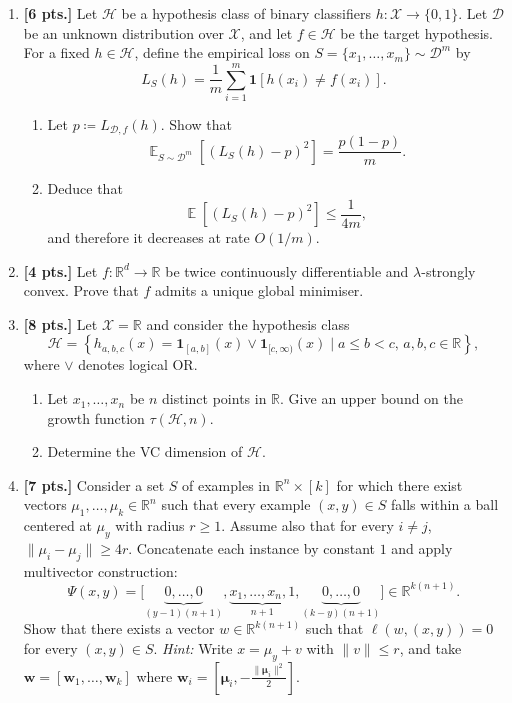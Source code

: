 \documentclass[11pt,a4paper]{article}
\DeclareMathOperator{\E}{\mathbb{E}}
\begin{document}
\begin{enumerate}[label=\textbf{(\arabic*)}]
    \item \textbf{[6 pts.]} Let $\mathcal{H}$ be a hypothesis class of binary classifiers $h : \mathcal{X} \to \{0, 1\}$. Let $\mathcal{D}$ be an unknown distribution over $\mathcal{X}$, and let $f \in \mathcal{H}$ be the target hypothesis. For a fixed $h \in \mathcal{H}$, define the empirical loss on $S = \{x_1, \dots, x_m\} \sim \mathcal{D}^m$ by
    \[
    L_S(h) = \frac{1}{m} \sum_{i=1}^m \mathbf{1}[h(x_i) \neq f(x_i)].
    \]
    \begin{enumerate}[label=(\a*)]
        \item Let $p \coloneqq L_{\mathcal{D}, f}(h)$. Show that
        \[
        \E_{S \sim \mathcal{D}^m} \left[ (L_S(h) - p)^2 \right] = \frac{p(1 - p)}{m}.
        \]
        \item Deduce that
        \[
        \E \left[ (L_S(h) - p)^2 \right] \le \frac{1}{4m},
        \]
        and therefore it decreases at rate $O(1/m)$.
    \end{enumerate}

    \item \textbf{[4 pts.]} Let $f : \mathbb{R}^d \to \mathbb{R}$ be twice continuously differentiable and $\lambda$-strongly convex. Prove that $f$ admits a unique global minimiser.

    \item \textbf{[8 pts.]} Let $\mathcal{X} = \mathbb{R}$ and consider the hypothesis class
    \[
    \mathcal{H} = \left\{ h_{a,b,c}(x) = \mathbf{1}_{[a,b]}(x) \lor \mathbf{1}_{[c,\infty)}(x) \mid a \le b < c, \, a, b, c \in \mathbb{R} \right\},
    \]
    where $\lor$ denotes logical OR.
    \begin{enumerate}[label=(\a*)]
        \item Let $x_1, \dots, x_n$ be $n$ distinct points in $\mathbb{R}$. Give an upper bound on the growth function $\tau(\mathcal{H}, n)$.
        \item Determine the VC dimension of $\mathcal{H}$.
    \end{enumerate}

    \item \textbf{[7 pts.]} Consider a set $S$ of examples in $\mathbb{R}^n \times [k]$ for which there exist vectors $\mu_1, \dots, \mu_k \in \mathbb{R}^n$ such that every example $(x, y) \in S$ falls within a ball centered at $\mu_y$ with radius $r \ge 1$. Assume also that for every $i \neq j$, $\|\mu_i - \mu_j\| \ge 4r$. Concatenate each instance by constant $1$ and apply multivector construction:
    \[
    \Psi(x, y) = \bigl[ \underbrace{0, \dots, 0}_{(y-1)(n+1)}, \underbrace{x_1, \dots, x_n, 1}_{n+1}, \underbrace{0, \dots, 0}_{(k-y)(n+1)} \bigr] \in \mathbb{R}^{k(n+1)}.
    \]
    Show that there exists a vector $w \in \mathbb{R}^{k(n+1)}$ such that $\ell(w, (x, y)) = 0$ for every $(x, y) \in S$.
    \textit{Hint:} Write $x = \mu_y + v$ with $\|v\| \le r$, and take $\mathbf{w} = [\mathbf{w}_1, \dots, \mathbf{w}_k]$ where $\mathbf{w}_i = [\bm{\mu}_i, -\frac{\|\bm{\mu}_i\|^2}{2}]$.


\end{enumerate}
\end{document}
